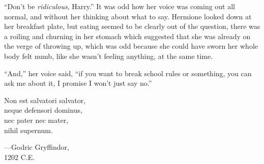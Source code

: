 “Don’t be \emph{ridiculous}, Harry.” It was odd how her voice was coming out all normal, and without her thinking about what to say. Hermione looked down at her breakfast plate, but eating seemed to be clearly out of the question, there was a roiling and churning in her stomach which suggested that she was already on the verge of throwing up, which was odd because she could have sworn her whole body felt numb, like she wasn’t feeling anything, at the same time.

“And,” her voice said, “if you want to break school rules or something, you can ask me about it, I promise I won’t just say no.”

\later

\begin{center}
Non est salvatori salvator,\\
neque defensori dominus,\\
nec pater nec mater,\\
nihil supernum.

—Godric Gryffindor,\\
1202 C.E.
\end{center}
